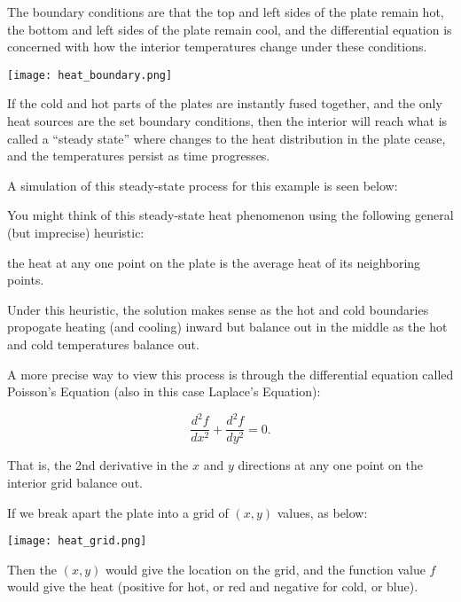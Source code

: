 \documentclass{ximera}
\begin{document}
The boundary conditions are that the top and left sides of the plate remain hot, the bottom and left sides of the plate remain cool, and the differential equation is concerned with how the interior temperatures change under these conditions.

\begin{center}
    \texttt{[image: heat\_boundary.png]}
\end{center}

If the cold and hot parts of the plates are instantly fused together, and the only heat sources are the set boundary conditions, then the interior will reach what is called a ``steady state'' where changes to the heat distribution in the plate cease, and the temperatures persist as time progresses. 

A simulation of this steady-state process for this example is seen below:

\begin{center}
\end{center}

You might think of this steady-state heat phenomenon using the following general (but imprecise) heuristic: 

the heat at any one point on the plate is the average heat of its neighboring points. 

Under this heuristic, the solution makes sense as the hot and cold boundaries propogate heating (and cooling) inward but balance out in the middle as the hot and cold temperatures balance out. 

A more precise way to view this process is through the differential equation called Poisson's Equation (also in this case Laplace's Equation): 

$$\frac{d^2f}{dx^2}+\frac{d^2f}{dy^2}=0.$$

That is, the 2nd derivative in the $x$ and $y$ directions at any one point on the interior grid balance out.

If we break apart the plate into a grid of $(x,y)$ values, as below:

\begin{center}
    \texttt{[image: heat\_grid.png]}
\end{center}

Then the $(x,y)$ would give the location on the grid, and the function value $f$ would give the heat (positive for hot, or red and negative for cold, or blue).
\end{document}
